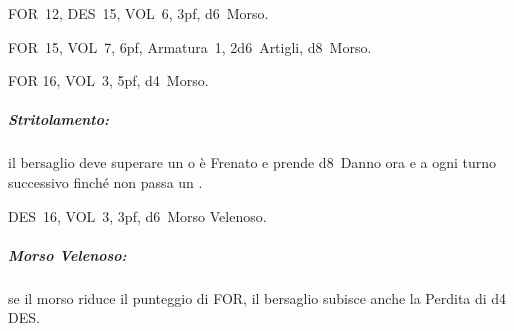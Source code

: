\documentclass[itdr]{subfiles}
\begin{document}
\vspace{2ex}

FOR~12, DES~15, VOL~6, 3pf, d6~Morso.

\vspace{2ex}

FOR~15, VOL~7, 6pf, Armatura~1, 2d6~Artigli, d8~Morso.

\vspace{2ex}

FOR 16, VOL~3, 5pf, d4~Morso.
\subparagraph{Stritolamento:} il bersaglio deve superare un  o è Frenato e prende d8~Danno ora e a ogni turno successivo finché non passa un .

\vspace{2ex}

DES~16, VOL~3, 3pf, d6~Morso Velenoso.
\subparagraph{Morso Velenoso:} se il morso riduce il punteggio di FOR, il bersaglio subisce anche la Perdita di d4 DES.

\vfill
\end{document}
